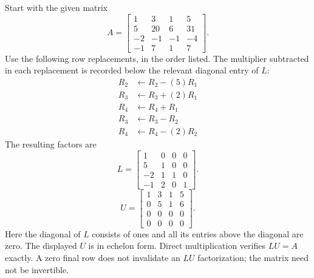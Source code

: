Start with the given matrix
\[A=\left[\begin{matrix}1 & 3 & 1 & 5\\5 & 20 & 6 & 31\\-2 & -1 & -1 & -4\\-1 & 7 & 1 & 7\end{matrix}\right].\]
Use the following row replacements, in the order listed. The multiplier
subtracted in each replacement is recorded below the relevant diagonal
entry of $L$:
\begin{align*}R_{2}&\leftarrow R_{2}-(5)R_{1}\\
R_{3}&\leftarrow R_{3}+(2)R_{1}\\
R_{4}&\leftarrow R_{4}+R_{1}\\
R_{3}&\leftarrow R_{3}-R_{2}\\
R_{4}&\leftarrow R_{4}-(2)R_{2}\end{align*}The resulting factors are
\[L=\left[\begin{matrix}1 & 0 & 0 & 0\\5 & 1 & 0 & 0\\-2 & 1 & 1 & 0\\-1 & 2 & 0 & 1\end{matrix}\right].\]
\[U=\left[\begin{matrix}1 & 3 & 1 & 5\\0 & 5 & 1 & 6\\0 & 0 & 0 & 0\\0 & 0 & 0 & 0\end{matrix}\right].\]Here the diagonal of $L$ consists of ones and all its entries above
the diagonal are zero. The displayed $U$ is in echelon form.
Direct multiplication verifies $LU=A$ exactly. A zero final row does not
invalidate an $LU$ factorization; the matrix need not be invertible.

